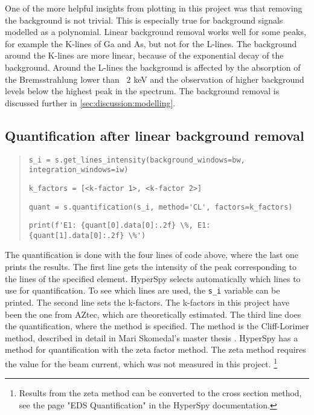 One of the more helpful insights from plotting in this project was that removing the background is not trivial.
This is especially true for background signals modelled as a polynomial.
Linear background removal works well for some peaks, for example the K-lines of Ga and As, but not for the L-lines.
The background around the K-lines are more linear, because of the exponential decay of the background.
Around the L-lines the background is affected by the absorption of the Bremsstrahlung lower than ~2 keV and the observation of higher background levels below the highest peak in the spectrum.
The background removal is discussed further in \cref{sec:discussion:modelling}.








\subsection{Quantification after linear background removal}
\label{sec:discussion:steps:quantification:linear}

\begin{quote}
    \verb|s_i = s.get_lines_intensity(background_windows=bw, integration_windows=iw)|

    \verb|k_factors = [<k-factor 1>, <k-factor 2>]  |

    \verb|quant = s.quantification(s_i, method='CL', factors=k_factors)|

    \verb|print(f'E1: {quant[0].data[0]:.2f} \%, E1: {quant[1].data[0]:.2f} \%')|
\end{quote}

The quantification is done with the four lines of code above, where the last one prints the results.
The first line gets the intensity of the peak corresponding to the lines of the specified element.
HyperSpy selects automatically which lines to use for quantification.
To see which lines are used, the \verb|s_i| variable can be printed.
The second line sets the k-factors.
The k-factors in this project have been the one from AZtec, which are theoretically estimated.
The third line does the quantification, where the method is specified.
The method is the Cliff-Lorimer method, described in detail in Mari Skomedal's master thesis \cite[Sec. 2.2.3]{skomedal_improving_2022}.
HyperSpy has a method for quantification with the zeta factor method.
The zeta method requires the value for the beam current, which was not measured in this project. \footnote{Results from the zeta method can be converted to the cross section method, see the page "EDS Quantification" in the HyperSpy documentation.}



